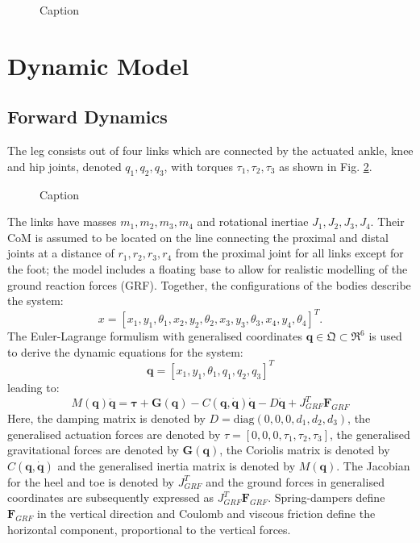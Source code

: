 \documentclass[letterpaper, 10 pt, conference]{ieeeconf}  %
\begin{document}
\begin{figure}[b]
	\centering
	\caption{Caption}
	\label{fig:configurations}
\end{figure}

\section{Dynamic Model}

\subsection{Forward Dynamics} 
The leg consists out of four links which are connected by the actuated ankle, knee and hip joints, denoted $q_1,q_2,q_3$, with torques $\tau_1,\tau_2,\tau_3$ as shown in Fig. \ref{fig:leg}. 
\begin{figure}[b]
	\centering
	\caption{Caption}
	\label{fig:leg}
\end{figure}
The links have masses $m_1,m_2,m_3,m_4$ and rotational inertiae $J_1,J_2,J_3,J_4$. Their CoM is assumed to be located on the line connecting the proximal and distal joints at a distance of $r_1,r_2,r_3,r_4$ from the proximal joint for all links except for the foot; the model includes a floating base to allow for realistic modelling of the ground reaction forces (GRF). Together, the configurations of the bodies describe the system:
 \begin{equation}
x = [x_1,y_1,\theta_1,x_2,y_2,\theta_2, x_3,y_3,\theta_3,x_4,y_4,\theta_4]^T. 
\end{equation}
The Euler-Lagrange formulism with generalised coordinates $\mathbf{q} \in \mathfrak{Q} \subset \mathfrak{R}^{6}$ is used to derive the dynamic equations for the system:
 \begin{equation}
\mathbf{q}=[x_1,y_1,\theta_1,q_1,q_2,q_3]^T \label{eq:q}
 \end{equation}
leading to:
 \begin{equation}
M(\mathbf{q})\mathbf{\ddot q} = \mathbf{\tau + G(q)} - C\mathbf{(q,\dot q)\dot q -} D \mathbf{\dot q} + J_{GRF}^T \mathbf{F}_{GRF}  \label{eq:fwddyn}
 \end{equation}
Here, the damping matrix is denoted by $D = \text{diag} (0,0,0,d_1,d_2,d_3)$, the generalised actuation forces are denoted by $\tau = [0,0,0,\tau_1,\tau_2,\tau_3]$, the generalised gravitational forces are denoted by $\mathbf{G(q)}$, the Coriolis matrix is denoted by $C\mathbf{(q, \dot q)}$ and the generalised inertia matrix is denoted by $M(\mathbf{q})$. The Jacobian for the heel and toe is denoted by $J_{GRF}^T$ and the ground forces in generalised coordinates are subsequently expressed as $J_{GRF}^T \mathbf{F}_{GRF}$. Spring-dampers define $\mathbf{F}_{GRF}$ in the vertical direction and Coulomb and viscous friction define the horizontal component, proportional to the vertical forces.
 
\end{document}
